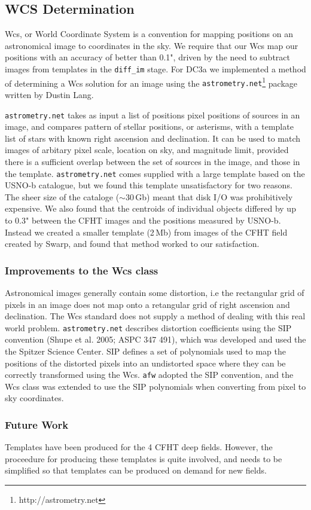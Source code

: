 
\subsection{WCS Determination}

Wcs, or World Coordinate System is a convention for mapping positions on an astronomical image to coordinates in the sky. We require that our Wcs map our positions with an accuracy of better than 0.1", driven by the need to subtract images from templates in the {\tt diff\_im} stage. For DC3a we implemented a method of determining a Wcs solution for an image using the {\tt astrometry.net}\footnote{http://astrometry.net} package written by Dustin Lang. 

{\tt astrometry.net} takes as input a list of positions pixel positions of sources in an image, and compares pattern of stellar positions, or asterisms, with a template list of stars with known right ascension and declination. It can be used to match images of arbitary pixel scale, location on sky, and magnitude limit, provided there is a sufficient overlap between the set of sources in the image, and those in the template. {\tt astrometry.net} comes supplied with a large template based on the USNO-b catalogue, but we found this template unsatisfactory for two reasons. The sheer size of the cataloge ($\sim$30\,Gb) meant that disk I/O was prohibitively expensive. We also found that the centroids of individual objects differed by up to 0.3" between the CFHT images and the positions measured by USNO-b. Instead we created a smaller template (2\,Mb) from images of the CFHT field created by Swarp, and found that method worked to our satisfaction.

\subsubsection{Improvements to the Wcs class}
Astronomical images generally contain some distortion, i.e the rectangular grid of pixels in an image does not map onto a retangular grid of right ascension and declination. The Wcs standard does not supply a method of dealing with this real world problem. {\tt astrometry.net} describes distortion coefficients using the SIP convention (Shupe et al. 2005; ASPC 347 491), which was developed and used the the Spitzer Science Center. SIP defines a set of polynomials used to map the positions of the distorted pixels into an undistorted space where they can be correctly transformed using the Wcs. {\tt afw} adopted the SIP convention, and the Wcs class was extended to use the SIP polynomials when converting from pixel to sky coordinates.


\subsubsection{Future Work}
Templates have been produced for the 4 CFHT deep fields. However, the proceedure for producing these templates is quite involved, and needs to be simplified so that templates can be produced on demand for new fields.

